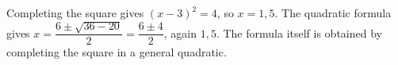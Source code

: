Completing the square gives $(x-3)^2=4$, so $x=1,5$. The quadratic formula gives $x=\dfrac{6\pm\sqrt{36-20}}{2}=\dfrac{6\pm4}{2}$, again $\boxed{1,5}$. The formula itself is obtained by completing the square in a general quadratic.
